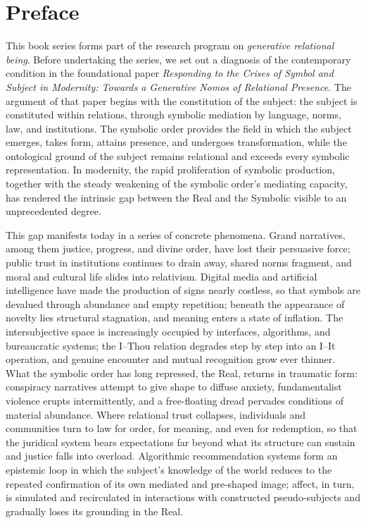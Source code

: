 
\frontmatter

\chapter*{Preface}

This book series forms part of the research program on \emph{generative relational being}. Before undertaking the series, we set out a diagnosis of the contemporary condition in the foundational paper \emph{Responding to the Crises of Symbol and Subject in Modernity: Towards a Generative Nomos of Relational Presence}. The argument of that paper begins with the constitution of the subject: the subject is constituted within relations, through symbolic mediation by language, norms, law, and institutions. The symbolic order provides the field in which the subject emerges, takes form, attains presence, and undergoes transformation, while the ontological ground of the subject remains relational and exceeds every symbolic representation. In modernity, the rapid proliferation of symbolic production, together with the steady weakening of the symbolic order's mediating capacity, has rendered the intrinsic gap between the Real and the Symbolic visible to an unprecedented degree.

This gap manifests today in a series of concrete phenomena. Grand narratives, among them justice, progress, and divine order, have lost their persuasive force; public trust in institutions continues to drain away, shared norms fragment, and moral and cultural life slides into relativism. Digital media and artificial intelligence have made the production of signs nearly costless, so that symbols are devalued through abundance and empty repetition; beneath the appearance of novelty lies structural stagnation, and meaning enters a state of inflation. The intersubjective space is increasingly occupied by interfaces, algorithms, and bureaucratic systems; the I--Thou relation degrades step by step into an I--It operation, and genuine encounter and mutual recognition grow ever thinner. What the symbolic order has long repressed, the Real, returns in traumatic form: conspiracy narratives attempt to give shape to diffuse anxiety, fundamentalist violence erupts intermittently, and a free-floating dread pervades conditions of material abundance. Where relational trust collapses, individuals and communities turn to law for order, for meaning, and even for redemption, so that the juridical system bears expectations far beyond what its structure can sustain and justice falls into overload. Algorithmic recommendation systems form an epistemic loop in which the subject's knowledge of the world reduces to the repeated confirmation of its own mediated and pre-shaped image; affect, in turn, is simulated and recirculated in interactions with constructed pseudo-subjects and gradually loses its grounding in the Real.

